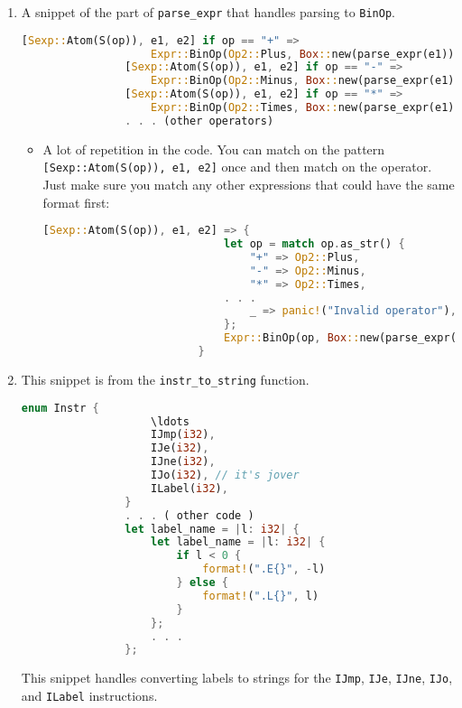 	\begin{enumerate}
		\item A snippet of the part of \verb|parse_expr| that handles parsing to \verb|BinOp|.
			\begin{lstlisting}[language=Rust]
				[Sexp::Atom(S(op)), e1, e2] if op == "+" =>
				    Expr::BinOp(Op2::Plus, Box::new(parse_expr(e1)), Box::new(parse_expr(e2))),
				[Sexp::Atom(S(op)), e1, e2] if op == "-" =>
				    Expr::BinOp(Op2::Minus, Box::new(parse_expr(e1)), Box::new(parse_expr(e2))),
				[Sexp::Atom(S(op)), e1, e2] if op == "*" =>
				    Expr::BinOp(Op2::Times, Box::new(parse_expr(e1)), Box::new(parse_expr(e2))),
				. . . (other operators)
			\end{lstlisting}
			\begin{itemize}
				\item A lot of repetition in the code. You can match on the pattern \verb|[Sexp::Atom(S(op)), e1, e2]| once and then match on the operator. Just make sure you match any other expressions that could have the same format first:

				\begin{lstlisting}[language=Rust]
						[Sexp::Atom(S(op)), e1, e2] => {
						    let op = match op.as_str() {
						        "+" => Op2::Plus,
						        "-" => Op2::Minus,
						        "*" => Op2::Times,
							. . .
						        _ => panic!("Invalid operator"),
						    };
						    Expr::BinOp(op, Box::new(parse_expr(e1)), Box::new(parse_expr(e2)))
						}
					\end{lstlisting}
			\end{itemize}

		\pagebreak
		\item This snippet is from the \verb|instr_to_string| function.
			\begin{lstlisting}[language=Rust]
				enum Instr {
				    \ldots
				    IJmp(i32),
				    IJe(i32),
				    IJne(i32),
				    IJo(i32), // it's jover
				    ILabel(i32),
				}
				. . . ( other code )
				let label_name = |l: i32| {
				    let label_name = |l: i32| {
				        if l < 0 {
				            format!(".E{}", -l)
				        } else {
				            format!(".L{}", l)
				        }
				    };
				    . . .
				};
			\end{lstlisting}

			This snippet handles converting labels to strings for the \verb|IJmp|, \verb|IJe|, \verb|IJne|, \verb|IJo|, and \verb|ILabel| instructions.


\end{enumerate}

